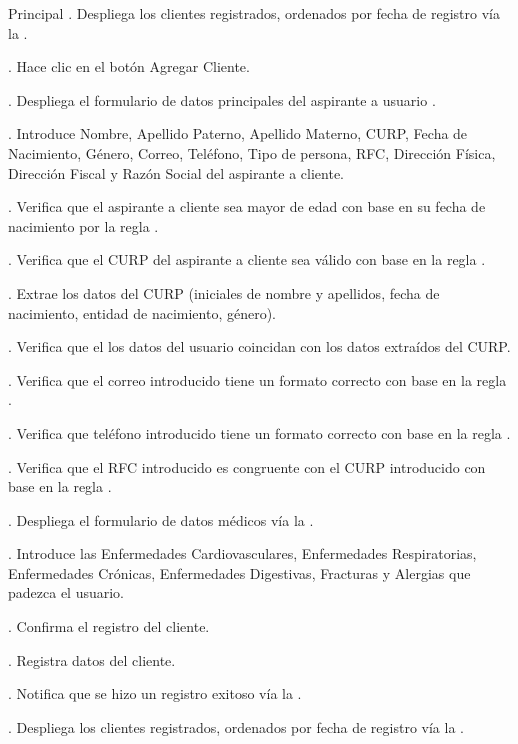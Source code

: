 	\begin{UCtrayectoria}{Principal}
		. Despliega los clientes registrados, ordenados por fecha de registro vía la  .
		
		. Hace clic en el botón Agregar Cliente.
		
		. Despliega el formulario de datos principales del aspirante a usuario  .
		
		. Introduce Nombre, Apellido Paterno, Apellido Materno, CURP, Fecha de Nacimiento, Género, Correo, Teléfono, Tipo de persona, RFC, Dirección Física, Dirección Fiscal y Razón Social del aspirante a cliente.
		
		. Verifica que el aspirante a cliente sea mayor de edad con base en su fecha de nacimiento por la regla   .
		
		. Verifica que el CURP del aspirante a cliente sea válido con base en la regla   .
		
		. Extrae los datos del CURP (iniciales de nombre y apellidos, fecha de nacimiento, entidad de nacimiento, género).
		
		. Verifica que el los datos del usuario coincidan con los datos extraídos del CURP.
		
		. Verifica que el correo introducido tiene un formato correcto con base en la regla   .
		
		. Verifica que teléfono introducido tiene un formato correcto con base en la regla   .
		
		. Verifica que el RFC introducido es congruente con el CURP introducido con base en la regla   .
		
		. Despliega el formulario de datos médicos vía la .
		
		. Introduce las Enfermedades Cardiovasculares, Enfermedades Respiratorias, Enfermedades Crónicas, Enfermedades Digestivas, Fracturas y Alergias que padezca el usuario.		
		
		. Confirma el registro del cliente.
		
		. Registra datos del cliente.
		
		. Notifica que se hizo un registro exitoso vía la .
		
		. Despliega los clientes registrados, ordenados por fecha de registro vía la  .
			
	\end{UCtrayectoria}
		
